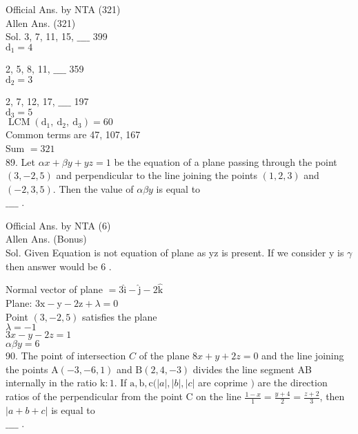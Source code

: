\documentclass[10pt]{article}
\begin{document}
Official Ans. by NTA (321)\\
Allen Ans. (321)\\
Sol. 3, 7, 11, 15, \(\_\_\_\_\) 399\\
\(\mathrm{d}_{1}=4\)

2, 5, 8, 11, \(\_\_\_\_\) 359\\
\(\mathrm{d}_{2}=3\)

2, 7, 12, 17, \(\_\_\_\_\) 197\\
\(\mathrm{d}_{3}=5\)\\
\(\operatorname{LCM}\left(\mathrm{d}_{1}, \mathrm{~d}_{2}, \mathrm{~d}_{3}\right)=60\)\\
Common terms are 47, 107, 167\\
Sum \(=321\)\\
89. Let \(\alpha x+\beta y+y z=1\) be the equation of a plane passing through the point \((3,-2,5)\) and perpendicular to the line joining the points \((1,2,3)\) and \((-2,3,5)\). Then the value of \(\alpha \beta y\) is equal to\\
\(\_\_\_\_\) .

Official Ans. by NTA (6)\\
Allen Ans. (Bonus)\\
Sol. Given Equation is not equation of plane as yz is present. If we consider y is \(\gamma\) then answer would be 6 .

Normal vector of plane \(=3 \hat{\mathrm{i}}-\hat{\mathrm{j}}-2 \hat{\mathrm{k}}\)\\
Plane: \(3 \mathrm{x}-\mathrm{y}-2 \mathrm{z}+\lambda=0\)\\
Point \((3,-2,5)\) satisfies the plane\\
\(\lambda=-1\)\\
\(3 x-y-2 z=1\)\\
\(\alpha \beta y=6\)\\
90. The point of intersection \(C\) of the plane \(8 x+y+2 z=0\) and the line joining the points \(\mathrm{A}(-3,-6,1)\) and \(\mathrm{B}(2,4,-3)\) divides the line segment AB internally in the ratio \(\mathrm{k}: 1\). If \(\mathrm{a}, \mathrm{b}, \mathrm{c} (|a|,|b|,|c|\) are coprime \()\) are the direction ratios of the perpendicular from the point C on the line \(\frac{1-x}{1}=\frac{y+4}{2}=\frac{z+2}{3}\), then \(|a+b+c|\) is equal to\\
\(\_\_\_\_\) .
\end{document}
